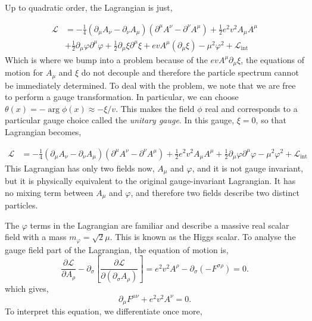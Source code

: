 Up to quadratic order, the Lagrangian is just, 

\begin{equation}
    \begin{split}
       \mathcal{L} &= -\frac{1}{4}(\partial_{\mu}A_{\nu} - \partial_{\nu}A_{\mu})(\partial^{\mu}A^{\nu} - \partial^{\nu}A^{\mu}) + \frac{1}{2}e^2v^2A_{\mu}A^{\mu}\\    
       &+\frac{1}{2}\partial_{\mu}\varphi\partial^{\mu}\varphi + \frac{1}{2}\partial_{\mu}\xi\partial^{\mu}\xi + evA^{\mu}\left(\partial_{\mu}\xi\right) - \mu^2\varphi^2 + \mathcal{L}_{\text{int}}
    \end{split}
\end{equation}
Which is where we bump into a problem because of the $evA^{\mu}\partial_{\mu}\xi$, the equations of motion for $A_{\mu}$ and $\xi$ do not decouple and therefore the particle spectrum cannot be immediately determined. To deal with the problem, we note that we are free to perform a gauge transformation. In particular, we can choose $\theta(x) = -\arg\phi(x) \approx -\xi/v$. This makes the field $\phi$ real and corresponds to a particular gauge choice called the \textit{unitary gauge}. In this gauge, $\xi=0$, so that Lagrangian becomes, 

\begin{equation}
    \begin{split}
       \mathcal{L} &= -\frac{1}{4}(\partial_{\mu}A_{\nu} - \partial_{\nu}A_{\mu})(\partial^{\mu}A^{\nu} - \partial^{\nu}A^{\mu}) + \frac{1}{2}e^2v^2A_{\mu}A^{\mu}+\frac{1}{2}\partial_{\mu}\varphi\partial^{\mu}\varphi  - \mu^2\varphi^2 + \mathcal{L}_{\text{int}}
    \end{split}
\end{equation}
This Lagrangian has only two fields now, $A_{\mu}$ and $\varphi$, and it is not gauge invariant, but it is physically equivalent to the original gauge-invariant Lagrangian. It has no mixing term between $A_{\mu}$ and $\varphi$, and therefore two fields describe two distinct particles. 

The $\varphi$ terms in the Lagrangian are familiar and describe a massive real scalar field with a mass $m_{\varphi} = \sqrt{2}\mu$. This is known as the Higgs scalar. To analyse the gauge field part of the Lagrangian, the equation of motion is, 
\begin{equation}
\frac{\partial \mathcal{L}}{\partial A_{\rho}} - \partial_{\sigma}\left[\frac{\partial \mathcal{L}}{\partial (\partial_{\sigma}A_{\rho})}\right] = e^2v^2A^{\rho} - \partial_{\sigma}\left(-F^{\sigma\rho}\right) = 0.
\end{equation}
which gives, 
\begin{equation}
    \partial_{\mu}F^{\mu\nu} + e^2v^2A^{\nu} =0. 
\end{equation}
To interpret this equation, we differentiate once more, 

